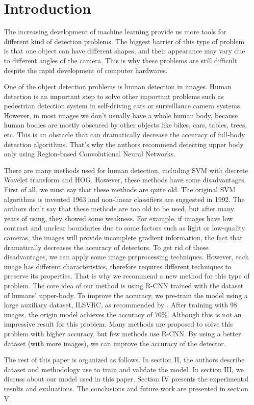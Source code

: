\section{Introduction}
The increasing development of machine learning provide us more tools for different kind of detection problems. The biggest barrier of this type of problem is that one object can have different shapes, and their appearance may vary due to different angles of the camera. This is why these problems are still difficult despite the rapid development of computer hardwares.

One of the object detection problems is human detection in images. Human detection is an important step to solve other important problems such as pedestrian detection system in self-driving cars or surveillance camera systems. However, in most images we don't usually have a whole human body, because human bodies are mostly obscured by other objects like bikes, cars, tables, trees, etc. This is an obstacle that can dramatically decrease the accuracy of full-body detection algorithms. That's why the authors recommend detecting upper body only using Region-based Convolutional Neural Networks.

There are many methods used for human detection, including SVM with discrete Wavelet transform \cite{wavelet} and HOG\cite{hog}. However, these methods have some disadvantages. First of all, we must say that these methods are quite old. The original SVM algorithms is invented 1963 and non-linear classifiers are suggested in 1992.\cite{svm} The authors don't say that these methods are too old to be used, but after many years of using, they showed some weakness.
For example, if images have low contrast and unclear boundaries due to some factors such as light or low-quality cameras, the images will provide incomplete gradient information, the fact that dramatically decreases the accuracy of detectors. To get rid of these disadvantages, we can apply some image preprocessing techniques. However, each image has different characteristics, therefore requires different techniques to preserve its properties. 
That is why we recommend a new method for this type of problem. The core idea of our method is using R-CNN trained with the dataset of humans' upper-body. To improve the accuracy, we pre-train the model using a large auxiliary dataset, ILSVRC, as recommended by \cite{rcnn}. After training with 98 images, the origin model achieves the accuracy of 70\%. Although this is not an impressive result for this problem. Many methods are proposed to solve this problem with higher accuracy, but few methods use R-CNN. By using a better dataset (with more images), we can improve the accuracy of the detector.

The rest of this paper is organized as follows. In section II, the authors describe dataset and methodology use to train and validate the model. In section III, we discuss about our model used in this paper. Section IV presents the experimental results and evaluations. The conclusions and future work are presented in section V. 
